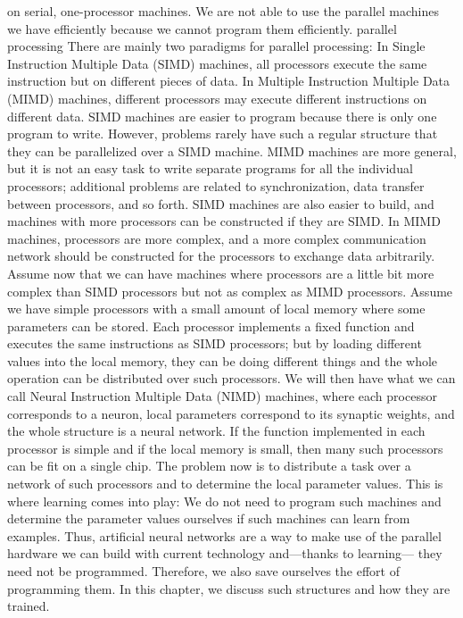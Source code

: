 on serial, one-processor machines. We are not able to use the parallel machines we have efficiently because we cannot program them efficiently. parallel processing There are mainly two paradigms for parallel processing: In Single Instruction Multiple Data (SIMD) machines, all processors execute the same instruction but on different pieces of data. In Multiple Instruction Multiple Data (MIMD) machines, different processors may execute different instructions on different data. SIMD machines are easier to program because there is only one program to write. However, problems rarely have such a regular structure that they can be parallelized over a SIMD machine. MIMD machines are more general, but it is not an easy task to write separate programs for all the individual processors; additional problems are related to synchronization, data transfer between processors, and so forth. SIMD machines are also easier to build, and machines with more processors can be constructed if they are SIMD. In MIMD machines, processors are more complex, and a more complex communication network should be constructed for the processors to exchange data arbitrarily. Assume now that we can have machines where processors are a little bit more complex than SIMD processors but not as complex as MIMD processors. Assume we have simple processors with a small amount of local memory where some parameters can be stored. Each processor implements a fixed function and executes the same instructions as SIMD processors; but by loading different values into the local memory, they can be doing different things and the whole operation can be distributed over such processors. We will then have what we can call Neural Instruction Multiple Data (NIMD) machines, where each processor corresponds to a neuron, local parameters correspond to its synaptic weights, and the whole structure is a neural network. If the function implemented in each processor is simple and if the local memory is small, then many such processors can be fit on a single chip. The problem now is to distribute a task over a network of such processors and to determine the local parameter values. This is where learning comes into play: We do not need to program such machines and determine the parameter values ourselves if such machines can learn from examples. Thus, artificial neural networks are a way to make use of the parallel hardware we can build with current technology and---thanks to learning--- they need not be programmed. Therefore, we also save ourselves the effort of programming them. In this chapter, we discuss such structures and how they are trained.

